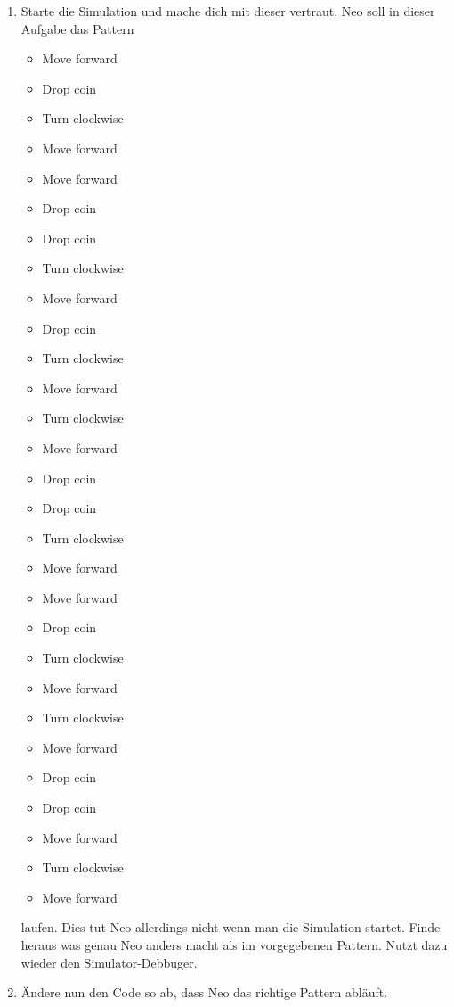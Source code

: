 
\begin{enumerate}
    \item Starte die Simulation und mache dich mit dieser vertraut. Neo soll in dieser Aufgabe das Pattern 
    \begin{itemize}
        \item Move forward
        \item Drop coin
        \item Turn clockwise
        \item Move forward
        \item Move forward
        \item Drop coin
        \item Drop coin
        \item Turn clockwise
        \item Move forward
        \item Drop coin
        \item Turn clockwise
        \item Move forward
        \item Turn clockwise
        \item Move forward
        \item Drop coin
        \item Drop coin
        \item Turn clockwise
        \item Move forward
        \item Move forward
        \item Drop coin
        \item Turn clockwise
        \item Move forward
        \item Turn clockwise
        \item Move forward
        \item Drop coin
        \item Drop coin
        \item Move forward
        \item Turn clockwise
        \item Move forward
    \end{itemize}
    laufen. Dies tut Neo allerdings nicht wenn man die Simulation startet. Finde heraus was genau Neo anders macht als im vorgegebenen Pattern. Nutzt dazu wieder den Simulator-Debbuger.
    \item Ändere nun den Code so ab, dass Neo das richtige Pattern abläuft.
\end{enumerate}